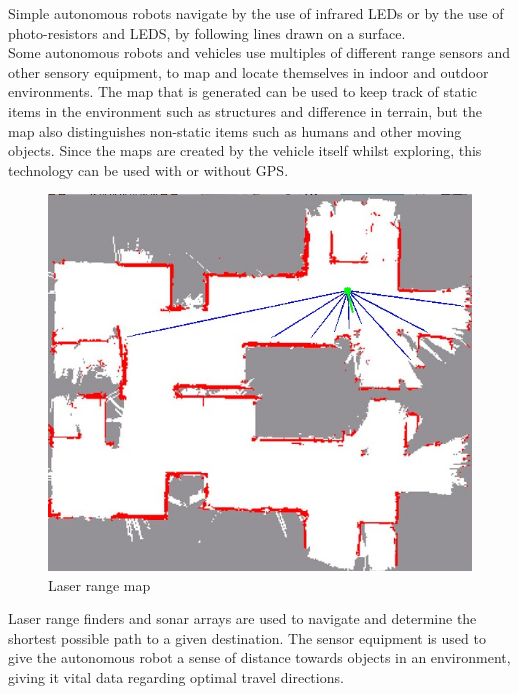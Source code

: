 Simple autonomous robots navigate by the use of infrared LEDs or by the use of photo-resistors and LEDS, by following lines drawn on a surface.\\
Some autonomous robots and vehicles use multiples of different range sensors and other sensory equipment, to map and locate themselves in indoor and outdoor environments. The map that is generated can be used to keep track of static items in the environment such as structures and difference in terrain, but the map also distinguishes non-static items such as humans and other moving objects. Since the maps are created by the vehicle itself whilst exploring, this technology can be used with or without GPS\cite{rangesens}\cite{rangesensarc}. 

\begin{figure}[H]
	\centering
	\includegraphics[scale=.7]{images/laserrangemap.jpg}
	\caption{Laser range map}
	\label{fig:laserrangemap}
\end{figure}

Laser range finders and sonar arrays are used to navigate and determine the shortest possible path to a given destination. The sensor equipment is used to give the autonomous robot a sense of distance towards objects in an environment, giving it vital data regarding optimal travel directions.\cite{lasersonar}






